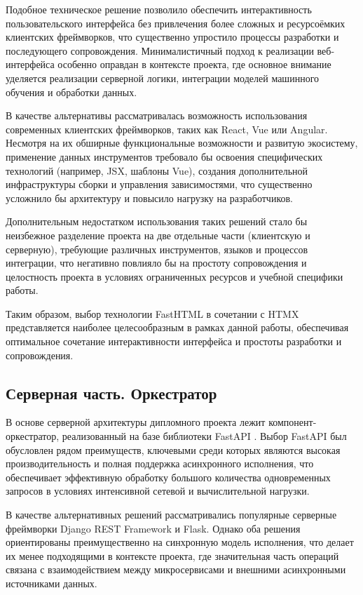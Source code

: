 Подобное техническое решение позволило обеспечить
интерактивность пользовательского интерфейса
без привлечения более сложных и ресурсоёмких клиентских фреймворков,
что существенно упростило процессы разработки и последующего сопровождения.
Минималистичный подход к реализации веб-интерфейса
особенно оправдан в контексте проекта,
где основное внимание уделяется реализации серверной логики,
интеграции моделей машинного обучения и обработки данных.

В качестве альтернативы рассматривалась возможность использования
современных клиентских фреймворков, таких как React, Vue или Angular.
Несмотря на их обширные функциональные возможности
и развитую экосистему, применение данных инструментов
требовало бы освоения специфических технологий (например, JSX, шаблоны Vue),
создания дополнительной инфраструктуры сборки и управления зависимостями,
что существенно усложнило бы архитектуру и повысило нагрузку на разработчиков.

Дополнительным недостатком использования таких решений
стало бы неизбежное разделение проекта
на две отдельные части (клиентскую и серверную),
требующие различных инструментов, языков и процессов интеграции,
что негативно повлияло бы на простоту сопровождения
и целостность проекта в условиях ограниченных ресурсов
и учебной специфики работы.

Таким образом, выбор технологии FastHTML в сочетании с HTMX
представляется наиболее целесообразным в рамках данной работы,
обеспечивая оптимальное сочетание интерактивности интерфейса
и простоты разработки и сопровождения.

\subsection{Серверная часть. Оркестратор}

В основе серверной архитектуры дипломного проекта
лежит компонент-оркестратор, реализованный на базе библиотеки FastAPI \cite{Fastapi}.
Выбор FastAPI был обусловлен рядом преимуществ,
ключевыми среди которых являются высокая производительность
и полная поддержка асинхронного исполнения,
что обеспечивает эффективную обработку большого количества одновременных запросов
в условиях интенсивной сетевой и вычислительной нагрузки.

В качестве альтернативных решений рассматривались
популярные серверные фреймворки Django REST Framework и Flask.
Однако оба решения ориентированы преимущественно
на синхронную модель исполнения,
что делает их менее подходящими в контексте проекта,
где значительная часть операций связана с взаимодействием
между микросервисами и внешними асинхронными источниками данных.

